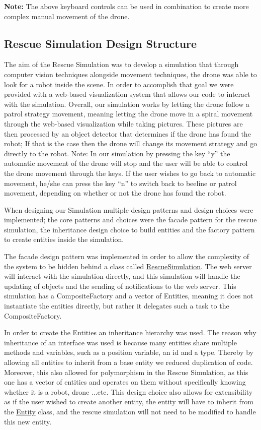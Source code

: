 {\bfseries Note\+:} The above keyboard controls can be used in combination to create more complex manual movement of the drone.

\subsection*{Rescue Simulation Design Structure}

The aim of the Rescue Simulation was to develop a simulation that through computer vision techniques alongside movement techniques, the drone was able to look for a robot inside the scene. In order to accomplish that goal we were provided with a web-\/based visualization system that allows our code to interact with the simulation. Overall, our simulation works by letting the drone follow a patrol strategy movement, meaning letting the drone move in a spiral movement through the web-\/based visualization while taking pictures. These pictures are then processed by an object detector that determines if the drone has found the robot; If that is the case then the drone will change its movement strategy and go directly to the robot. Note\+: In our simulation by pressing the key “y” the automatic movement of the drone will stop and the user will be able to control the drone movement through the keys. If the user wishes to go back to automatic movement, he/she can press the key “n” to switch back to beeline or patrol movement, depending on whether or not the drone has found the robot.

When designing our Simulation multiple design patterns and design choices were implemented; the core patterns and choices were the facade pattern for the rescue simulation, the inheritance design choice to build entities and the factory pattern to create entities inside the simulation.

The facade design pattern was implemented in order to allow the complexity of the system to be hidden behind a class called \hyperlink{classRescueSimulation}{Rescue\+Simulation}. The web server will interact with the simulation directly, and this simulation will handle the updating of objects and the sending of notifications to the web server. This simulation has a Composite\+Factory and a vector of Entities, meaning it does not instantiate the entities directly, but rather it delegates such a task to the Composite\+Factory. 

In order to create the Entities an inheritance hierarchy was used. The reason why inheritance of an interface was used is because many entities share multiple methods and variables, such as a position variable, an id and a type. Thereby by allowing all entities to inherit from a base entity we reduced duplication of code. Moreover, this also allowed for polymorphism in the Rescue Simulation, as this one has a vector of entities and operates on them without specifically knowing whether it is a robot, drone ...etc. This design choice also allows for extensibility as if the user wished to create another entity, the entity will have to inherit from the \hyperlink{classEntity}{Entity} class, and the rescue simulation will not need to be modified to handle this new entity.



